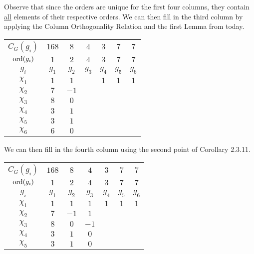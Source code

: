 \begin{boxexample}[Constructing the Character Table of $G = \PSL{2, 7}$]
\begin{table}[H]
\begin{tabular}{|c|cccccc|}
        \end{tabular}
    \end{table}
    Observe that since the orders are unique for the first four columns, they contain \underline{all} elements of their respective orders. We can then fill in the third column by applying the Column Orthogonality Relation and the first Lemma from today. %
    \begin{table}[H]
        \centering
        \begin{tabular}{|c|cccccc|}
            $C_G(g_i)$ & $168$ & $8$ & $4$ & $3$ & $7$ & $7$ \\
            $\operatorname{ord}\!\left( g_i \right)$ & $1$ & $2$ & $4$ & $3$ & $7$ & $7$ \\
            $g_i$ & $g_1$ & $g_2$ & $g_3$ & $g_4$ & $g_5$ & $g_6$ \\
            \hline
            $\chi_1$ & $1$ & $1$ & & $1$ & $1$ & $1$ \\
            $\chi_2$ & $7$ & $-1$ & & & & \\
            $\chi_3$ & $8$ & $0$ & & & & \\
            $\chi_4$ & $3$ & $1$ &  & & \\
            $\chi_5$ & $3$ & $1$ & & & & \\
            $\chi_6$ & $6$ & $0$ & & & & \\
        \end{tabular}
    \end{table}
    We can then fill in the fourth column using the second point of Corollary 2.3.11. %
    \begin{table}[H]
        \centering
        \begin{tabular}{|c|cccccc|}
            $C_G(g_i)$ & $168$ & $8$ & $4$ & $3$ & $7$ & $7$ \\
            $\operatorname{ord}\!\left( g_i \right)$ & $1$ & $2$ & $4$ & $3$ & $7$ & $7$ \\
            $g_i$ & $g_1$ & $g_2$ & $g_3$ & $g_4$ & $g_5$ & $g_6$ \\
            \hline
            $\chi_1$ & $1$ & $1$ & $1$ & $1$ & $1$ & $1$ \\
            $\chi_2$ & $7$ & $-1$ & $1$ & & & \\
            $\chi_3$ & $8$ & $0$ & $-1$ & & & \\
            $\chi_4$ & $3$ & $1$ & $0$ & & & \\
            $\chi_5$ & $3$ & $1$ & $0$ & & & \\

\end{tabular}
\end{table}
\end{boxexample}
